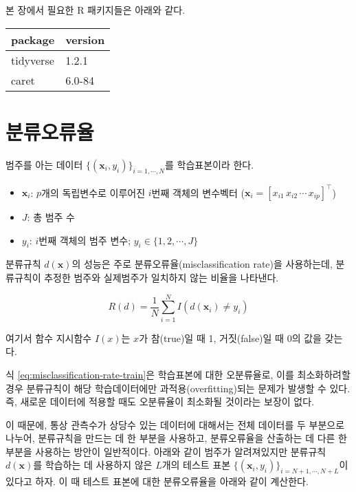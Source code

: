 \documentclass[]{book}
\providecommand{\tightlist}{%
  \setlength{\itemsep}{0pt}\setlength{\parskip}{0pt}}
\begin{document}
본 장에서 필요한 R 패키지들은 아래와 같다.

\begin{tabular}{l|l}
\hline
package & version\\
\hline
tidyverse & 1.2.1\\
\hline
caret & 6.0-84\\
\hline
\end{tabular}

\hypertarget{classifier-evaluation-misclassification-rate}{%
\section{분류오류율}\label{classifier-evaluation-misclassification-rate}}

범주를 아는 데이터 \(\{(\mathbf{x}_i, y_i)\}_{i = 1, \cdots, N}\)를 학습표본이라 한다.

\begin{itemize}
\tightlist
\item
  \(\mathbf{x}_i\): \(p\)개의 독립변수로 이루어진 \(i\)번째 객체의 변수벡터 (\(\mathbf{x}_i = [x_{i1} \, x_{i2} \, \cdots \, x_{ip}]^\top\))
\item
  \(J\): 총 범주 수
\item
  \(y_i\): \(i\)번째 객체의 범주 변수; \(y_i \in \{1, 2, \cdots, J\}\)
\end{itemize}

분류규칙 \(d(\mathbf{x})\)의 성능은 주로 분류오류율(misclassification rate)을 사용하는데, 분류규칙이 추정한 범주와 실제범주가 일치하지 않는 비율을 나타낸다.

\begin{equation}
R(d) = \frac{1}{N} \sum_{i = 1}^{N} I(d(\mathbf{x}_i) \neq y_i)
\label{eq:misclassification-rate-train}
\end{equation}

여기서 함수 지시함수 \(I(x)\)는 \(x\)가 참(true)일 때 1, 거짓(false)일 때 0의 값을 갖는다.

식 \eqref{eq:misclassification-rate-train}은 학습표본에 대한 오분류율로, 이를 최소화하려할 경우 분류규칙이 해당 학습데이터에만 과적용(overfitting)되는 문제가 발생할 수 있다. 즉, 새로운 데이터에 적용할 때도 오분류율이 최소화될 것이라는 보장이 없다.

이 때문에, 통상 관측수가 상당수 있는 데이터에 대해서는 전체 데이터를 두 부분으로 나누어, 분류규칙을 만드는 데 한 부분을 사용하고, 분류오류율을 산출하는 데 다른 한 부분을 사용하는 방안이 일반적이다. 아래와 같이 범주가 알려져있지만 분류규칙 \(d(\mathbf{x})\)를 학습하는 데 사용하지 않은 \(L\)개의 테스트 표본 \(\{(\mathbf{x}_i, y_i)\}_{i = N + 1, \cdots, N + L}\)이 있다고 하자. 이 때 테스트 표본에 대한 분류오류율을 아래와 같이 계산한다.
\end{document}
